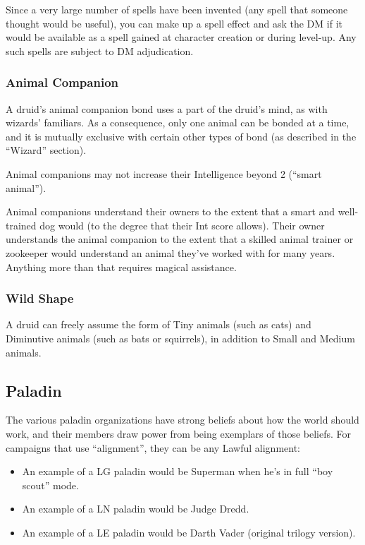 Since a very large number of spells have been invented (any spell that
someone thought would be useful), you can make up a spell effect and ask
the DM if it would be available as a spell gained at character creation or
during level-up. Any such spells are subject to DM adjudication.

\subsubsection{Animal Companion}

A druid's animal companion bond uses a part of the druid's mind, as with
wizards' familiars. As a consequence, only one animal can be bonded at a
time, and it is mutually exclusive with certain other types of bond (as
described in the ``Wizard'' section).

Animal companions may not increase their Intelligence beyond 2 (``smart
animal'').

Animal companions understand their owners to the extent that a smart and
well-trained dog would (to the degree that their Int score allows). Their
owner understands the animal companion to the extent that a skilled animal
trainer or zookeeper would understand an animal they've worked with for
many years. Anything more than that requires magical assistance.

\subsubsection{Wild Shape}

A druid can freely assume the form of Tiny animals (such as cats) and
Diminutive animals (such as bats or squirrels), in addition to Small and
Medium animals.
%

%
\subsection{Paladin}

The various paladin organizations have strong beliefs about how the world
should work, and their members draw power from being exemplars of those
beliefs. For campaigns that use ``alignment'', they can be any Lawful
alignment:

\begin{itemize}
\item An example of a LG paladin would be Superman when he's in full ``boy
scout'' mode.
\item An example of a LN paladin would be Judge Dredd.
\item An example of a LE paladin would be Darth Vader (original trilogy
version).
\end{itemize}

